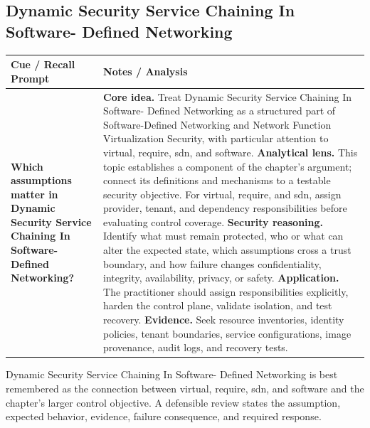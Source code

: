 \documentclass[11pt]{article}
\newcommand{\CornellHeader}{%
\rowcolor{Navy}\color{white}\bfseries Cue / Recall Prompt & \color{white}\bfseries Notes / Analysis\\\hline}
\newcommand{\CornellRow}[2]{%
\cellcolor{CueGray}\RaggedRight\textbf{#1} & \RaggedRight #2\\\hline}
\begin{document}
\subsection*{Dynamic Security Service Chaining In Software- Defined Networking}
\begin{longtable}{>{\RaggedRight\arraybackslash}p{}|>{\RaggedRight\arraybackslash}p{}}
\CornellHeader
\CornellRow{Which assumptions matter in Dynamic Security Service Chaining In Software- Defined Networking?}{\textbf{Core idea.} Treat Dynamic Security Service Chaining In Software- Defined Networking as a structured part of Software-Defined Networking and Network Function Virtualization Security, with particular attention to virtual, require, sdn, and software. \textbf{Analytical lens.} This topic establishes a component of the chapter's argument; connect its definitions and mechanisms to a testable security objective. For virtual, require, and sdn, assign provider, tenant, and dependency responsibilities before evaluating control coverage. \textbf{Security reasoning.} Identify what must remain protected, who or what can alter the expected state, which assumptions cross a trust boundary, and how failure changes confidentiality, integrity, availability, privacy, or safety. \textbf{Application.} The practitioner should assign responsibilities explicitly, harden the control plane, validate isolation, and test recovery. \textbf{Evidence.} Seek resource inventories, identity policies, tenant boundaries, service configurations, image provenance, audit logs, and recovery tests.}
\end{longtable}
\begin{topicsummary}
Dynamic Security Service Chaining In Software- Defined Networking is best remembered as the connection between virtual, require, sdn, and software and the chapter's larger control objective. A defensible review states the assumption, expected behavior, evidence, failure consequence, and required response.
\end{topicsummary}
\end{document}
